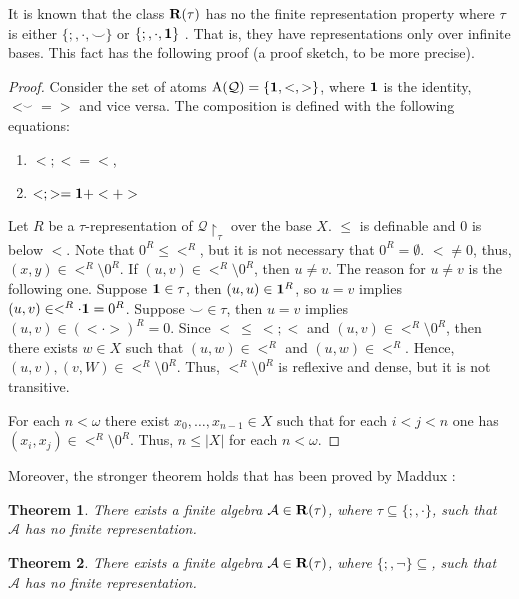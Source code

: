 \documentclass[a4paper]{article}
\theoremstyle{defin}
\theoremstyle{theorem}
\newtheorem{theorem}{Theorem}
\theoremstyle{prop}
\theoremstyle{lemma}
\theoremstyle{ex}
\theoremstyle{col}
\theoremstyle{claim}
\begin{document}
It is known that the class ${\bf R}(\tau)$ has no the finite representation property where $\tau$ is either $\{ ;, \cdot, \smile\}$ or $\{ ;, \cdot, {\bf 1} \}$ \cite{hirsch2004finite}. That is, they have representations only over infinite bases. This fact has the following proof (a proof sketch, to be more precise).
\begin{proof}
Consider the set of atoms $\operatorname{A}(\mathcal{Q}) = \{ {\bf 1}, <, > \}$, where ${\bf 1}$ is the identity, $<^{\smile} = >$ and vice versa. The composition is defined with the following equations:
\begin{enumerate}
  \item $< ; < = <$,
  \item $< ; > = {\bf 1} + < + >$
\end{enumerate}

Let $R$ be a $\tau$-representation of $\mathcal{Q} \upharpoonright_{\tau}$ over the base $X$. $\leq$ is definable and $0$ is below $<$. Note that $0^{R} \leq <^R$, but it is not necessary that $0^R = \emptyset$. $< \neq 0$, thus, $(x,y) \in <^R \setminus 0^R$. If $(u, v) \in <^R \setminus 0^R$, then $u \neq v$.
The reason for $u \neq v$ is the following one. Suppose ${\bf 1} \in \tau$, then $(u,u) \in {\bf 1}^R$, so $u = v$ implies $(u, v) \in <^R \cdot {\bf 1} = 0^R$. Suppose $\smile \in \tau$,
then $u = v$ implies $(u,v) \in (< \cdot >)^R = 0$. Since $< \: \leq \: < ; <$ and $(u, v) \in <^R \setminus 0^R$, then there exists $w \in X$ such that $(u, w) \in <^R$ and $(u, w) \in <^R$. Hence, $(u, v), (v, W) \in <^R \setminus 0^R$. Thus, $<^R \setminus 0^R$ is reflexive and dense, but it is not transitive.

For each $n < \omega$ there exist $x_0, \dots, x_{n - 1} \in X$ such that for each $i < j < n$ one has $(x_i, x_j) \in <^R \setminus 0^R$. Thus, $n \leq |X|$ for each $n < \omega$.
\end{proof}

Moreover, the stronger theorem holds that has been proved by Maddux \cite{maddux2016finite}:
\begin{theorem}
  There exists a finite algebra $\mathcal{A} \in {\bf R}(\tau)$, where $\tau \subseteq \{ ;, \cdot \}$, such that $\mathcal{A}$ has no finite representation.
\end{theorem}

\begin{theorem}
  There exists a finite algebra $\mathcal{A} \in {\bf R}(\tau)$, where $\{ ;, \neg \} \subseteq$, such that $\mathcal{A}$ has no finite representation.
\end{theorem}
\end{document}
